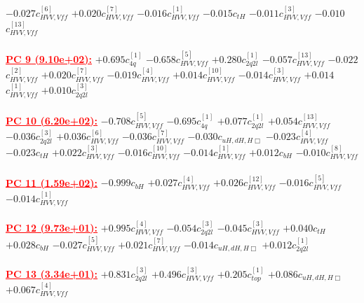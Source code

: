 \documentclass{article}
\begin{document}
{$-0.027$}{\rm $c_{HVV,Vff}^{[6]}$} 
{$+0.020$}{\rm $c_{HVV,Vff}^{[7]}$} 
{$-0.016$}{\rm $c_{HVV,Vff}^{[1]}$} 
{$-0.015$}{\rm $c_{tH}$} 
{$-0.011$}{\rm $c_{HVV,Vff}^{[3]}$} 
{$-0.010$}{\rm $c_{HVV,Vff}^{[13]}$} 
 \nonumber \\ \nonumber \\ 
\noindent \textcolor{red}{\underline{\bf{PC 9} (9.10e+02):}}
{$+0.695$}{\rm $c_{4q}^{[1]}$} 
{$-0.658$}{\rm $c_{HVV,Vff}^{[5]}$} 
{$+0.280$}{\rm $c_{2q2l}^{[1]}$} 
{$-0.057$}{\rm $c_{HVV,Vff}^{[13]}$} 
{$-0.022$}{\rm $c_{HVV,Vff}^{[2]}$} 
{$+0.020$}{\rm $c_{HVV,Vff}^{[7]}$} 
{$-0.019$}{\rm $c_{HVV,Vff}^{[4]}$} 
{$+0.014$}{\rm $c_{HVV,Vff}^{[10]}$} 
{$-0.014$}{\rm $c_{HVV,Vff}^{[3]}$} 
{$+0.014$}{\rm $c_{HVV,Vff}^{[1]}$} 
{$+0.010$}{\rm $c_{2q2l}^{[3]}$} 
 \nonumber \\ \nonumber \\ 
\noindent \textcolor{red}{\underline{\bf{PC 10} (6.20e+02):}}
{$-0.708$}{\rm $c_{HVV,Vff}^{[5]}$} 
{$-0.695$}{\rm $c_{4q}^{[1]}$} 
{$+0.077$}{\rm $c_{2q2l}^{[1]}$} 
{$+0.054$}{\rm $c_{HVV,Vff}^{[13]}$} 
{$-0.036$}{\rm $c_{2q2l}^{[3]}$} 
{$+0.036$}{\rm $c_{HVV,Vff}^{[6]}$} 
{$-0.036$}{\rm $c_{HVV,Vff}^{[7]}$} 
{$-0.030$}{\rm $c_{uH,dH,H\Box}$} 
{$-0.023$}{\rm $c_{HVV,Vff}^{[4]}$} 
{$-0.023$}{\rm $c_{tH}$} 
{$+0.022$}{\rm $c_{HVV,Vff}^{[3]}$} 
{$-0.016$}{\rm $c_{HVV,Vff}^{[10]}$} 
{$-0.014$}{\rm $c_{HVV,Vff}^{[1]}$} 
{$+0.012$}{\rm $c_{bH}$} 
{$-0.010$}{\rm $c_{HVV,Vff}^{[8]}$} 
 \nonumber \\ \nonumber \\ 
\noindent \textcolor{red}{\underline{\bf{PC 11} (1.59e+02):}}
{$-0.999$}{\rm $c_{bH}$} 
{$+0.027$}{\rm $c_{HVV,Vff}^{[4]}$} 
{$+0.026$}{\rm $c_{HVV,Vff}^{[12]}$} 
{$-0.016$}{\rm $c_{HVV,Vff}^{[5]}$} 
{$-0.014$}{\rm $c_{HVV,Vff}^{[1]}$} 
 \nonumber \\ \nonumber \\ 
\noindent \textcolor{red}{\underline{\bf{PC 12} (9.73e+01):}}
{$+0.995$}{\rm $c_{HVV,Vff}^{[4]}$} 
{$-0.054$}{\rm $c_{2q2l}^{[3]}$} 
{$-0.045$}{\rm $c_{HVV,Vff}^{[3]}$} 
{$+0.040$}{\rm $c_{tH}$} 
{$+0.028$}{\rm $c_{bH}$} 
{$-0.027$}{\rm $c_{HVV,Vff}^{[5]}$} 
{$+0.021$}{\rm $c_{HVV,Vff}^{[7]}$} 
{$-0.014$}{\rm $c_{uH,dH,H\Box}$} 
{$+0.012$}{\rm $c_{2q2l}^{[1]}$} 
 \nonumber \\ \nonumber \\ 
\noindent \textcolor{red}{\underline{\bf{PC 13} (3.34e+01):}}
{$+0.831$}{\rm $c_{2q2l}^{[3]}$} 
{$+0.496$}{\rm $c_{HVV,Vff}^{[3]}$} 
{$+0.205$}{\rm $c_{top}^{[1]}$} 
{$+0.086$}{\rm $c_{uH,dH,H\Box}$} 
{$+0.067$}{\rm $c_{HVV,Vff}^{[4]}$} 
\end{document}
